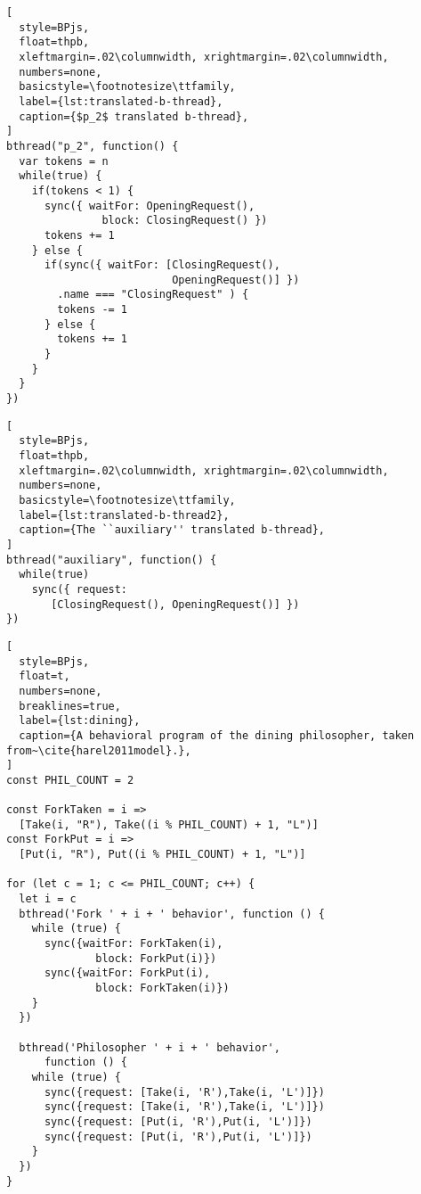 \documentclass[10pt,journal,compsoc]{IEEEtran}
\theoremstyle{definition}
\begin{document}
\begin{lstlisting}[
  style=BPjs,
  float=thpb,
  xleftmargin=.02\columnwidth, xrightmargin=.02\columnwidth,
  numbers=none,
  basicstyle=\footnotesize\ttfamily,
  label={lst:translated-b-thread},
  caption={$p_2$ translated b-thread},
]
bthread("p_2", function() {
  var tokens = n
  while(true) {
    if(tokens < 1) {
      sync({ waitFor: OpeningRequest(), 
               block: ClosingRequest() })
      tokens += 1
    } else {
      if(sync({ waitFor: [ClosingRequest(),
                          OpeningRequest()] })
        .name === "ClosingRequest" ) {
        tokens -= 1
      } else {
        tokens += 1
      }
    }
  }
})
\end{lstlisting}

\begin{lstlisting}[
  style=BPjs,
  float=thpb,
  xleftmargin=.02\columnwidth, xrightmargin=.02\columnwidth,
  numbers=none,
  basicstyle=\footnotesize\ttfamily,
  label={lst:translated-b-thread2},
  caption={The ``auxiliary'' translated b-thread},
]
bthread("auxiliary", function() {
  while(true)
    sync({ request: 
       [ClosingRequest(), OpeningRequest()] })
})
\end{lstlisting}

\begin{figure*}
\centering
{}
\caption{The PN model of~\cite{workcraftDinning} for the dining philosophers problem.}
\label{fig:dining-philosophers}
\end{figure*}

\begin{lstlisting}[
  style=BPjs,
  float=t,
  numbers=none,
  breaklines=true,
  label={lst:dining},
  caption={A behavioral program of the dining philosopher, taken from~\cite{harel2011model}.},
]
const PHIL_COUNT = 2

const ForkTaken = i => 
  [Take(i, "R"), Take((i % PHIL_COUNT) + 1, "L")]
const ForkPut = i => 
  [Put(i, "R"), Put((i % PHIL_COUNT) + 1, "L")]

for (let c = 1; c <= PHIL_COUNT; c++) {
  let i = c
  bthread('Fork ' + i + ' behavior', function () {
    while (true) {
      sync({waitFor: ForkTaken(i), 
              block: ForkPut(i)})
      sync({waitFor: ForkPut(i), 
              block: ForkTaken(i)})
    }
  })

  bthread('Philosopher ' + i + ' behavior', 
      function () {
    while (true) {
      sync({request: [Take(i, 'R'),Take(i, 'L')]})
      sync({request: [Take(i, 'R'),Take(i, 'L')]})
      sync({request: [Put(i, 'R'),Put(i, 'L')]})
      sync({request: [Put(i, 'R'),Put(i, 'L')]})
    }
  })
}
\end{lstlisting}
\end{document}
